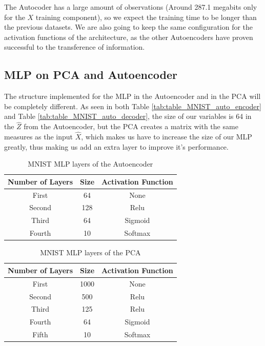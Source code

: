 The Autocoder has a large amount of observations (Around 287.1 megabits only for the $X$ training component), so we expect the training time to be longer than the previous datasets. We are also going to keep the same configuration for the activation functions of the architecture, as the other Autoencoders  have proven successful to the transference of information.

\subsection{MLP on PCA and Autoencoder}

The structure implemented for the MLP in the Autoencoder and in the PCA will be completely different. As seen in both Table \ref{tab:table_MNIST_auto_encoder} and Table \ref{tab:table_MNIST_auto_decoder}, the size of our variables is 64 in the $\hat{Z}$ from the Autoencoder, but the PCA creates a matrix with the same measures as the input $\hat{X}$, which makes us have to increase the size of our MLP greatly, thus making us add an extra layer to improve it's performance.
\par	

\begin{table}[H]
	\caption{MNIST MLP layers of the Autoencoder}
	\begin{center}
		\label{tab:table_MNIST_MLP_auto}
		\begin{tabular}{c|c|c} %
			\textbf{Number of Layers} & \textbf{Size} & \textbf{Activation Function} \\
			\hline
			First & 64 & None\\
			Second & 128 & Relu\\
			Third & 64  & Sigmoid\\
			Fourth & 10 & Softmax\\
		\end{tabular}
	\end{center}
\end{table}

\begin{table}[H]
	\caption{MNIST MLP layers of the PCA}
	\begin{center}
		\label{tab:table_MNIST_MLP_pca}
		\begin{tabular}{c|c|c} %
			\textbf{Number of Layers} & \textbf{Size} & \textbf{Activation Function} \\
			\hline
			First & 1000 & None\\
			Second & 500 & Relu\\
			Third & 125  & Relu\\
			Fourth & 64 & Sigmoid\\
			Fifth & 10 & Softmax \\
		\end{tabular}
	\end{center}
\end{table}

